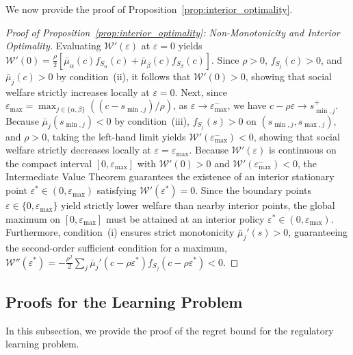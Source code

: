 We now provide the proof of Proposition~\ref{prop:interior_optimality}.
\begin{proof}[Proof of Proposition~\ref{prop:interior_optimality}: Non-Monotonicity and Interior Optimality]\label{app:proof_prop_interior_optimality}\label{proof:prop_interior_optimality}
Evaluating $\mathcal{W}'(\varepsilon)$ at $\varepsilon = 0$ yields $\mathcal{W}'(0) = \frac{\rho}{2} [ \bar{\mu}_\alpha(c) f_{S_\alpha}(c) + \bar{\mu}_\beta(c) f_{S_\beta}(c) ]$. Since $\rho > 0$, $f_{S_j}(c) > 0$, and $\bar{\mu}_j(c) > 0$ by condition~(ii), it follows that $\mathcal{W}'(0) > 0$, showing that social welfare strictly increases locally at $\varepsilon = 0$. Next, since $\varepsilon_{\max} = \max_{j\in\{\alpha,\beta\}} ((c - s_{\min,j})/\rho)$, as $\varepsilon \to \varepsilon_{\max}^-$, we have $c - \rho \varepsilon \to s_{\min, j}^+$. Because $\bar{\mu}_j(s_{\min, j}) < 0$ by condition~(iii), $f_{S_j}(s) > 0$ on $(s_{\min, j}, s_{\max, j})$, and $\rho > 0$, taking the left-hand limit yields $\mathcal{W}'(\varepsilon_{\max}^-) < 0$, showing that social welfare strictly decreases locally at $\varepsilon = \varepsilon_{\max}$. Because $\mathcal{W}'(\varepsilon)$ is continuous on the compact interval $[0, \varepsilon_{\max}]$ with $\mathcal{W}'(0) > 0$ and $\mathcal{W}'(\varepsilon_{\max}^-) < 0$, the Intermediate Value Theorem guarantees the existence of an interior stationary point $\varepsilon^* \in (0, \varepsilon_{\max})$ satisfying $\mathcal{W}'(\varepsilon^*) = 0$. Since the boundary points $\varepsilon \in \{0, \varepsilon_{\max}\}$ yield strictly lower welfare than nearby interior points, the global maximum on $[0, \varepsilon_{\max}]$ must be attained at an interior policy $\varepsilon^* \in (0, \varepsilon_{\max})$. Furthermore, condition~(i) ensures strict monotonicity $\bar{\mu}_j'(s) > 0$, guaranteeing the second-order sufficient condition for a maximum, $\mathcal{W}''(\varepsilon^*) = -\frac{\rho^2}{2} \sum_j \bar{\mu}_j'(c - \rho \varepsilon^*) f_{S_j}(c - \rho \varepsilon^*) < 0$.
\end{proof}

\subsection{Proofs for the Learning Problem}

In this subsection, we provide the proof of the regret bound for the regulatory learning problem.

